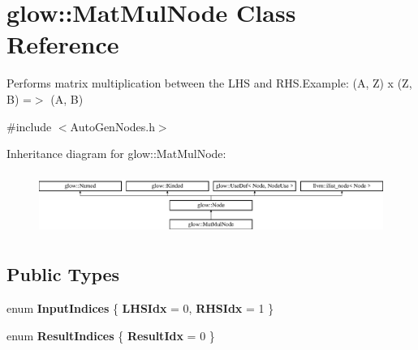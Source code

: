 \hypertarget{classglow_1_1_mat_mul_node}{}\section{glow\+:\+:Mat\+Mul\+Node Class Reference}
\label{classglow_1_1_mat_mul_node}


Performs matrix multiplication between the L\+HS and R\+H\+S.\+Example\+: (A, Z) x (Z, B) =$>$ (A, B)  




{\ttfamily \#include $<$Auto\+Gen\+Nodes.\+h$>$}

Inheritance diagram for glow\+:\+:Mat\+Mul\+Node\+:\begin{figure}[H]
\begin{center}
\leavevmode
\includegraphics[height=2.028986cm]{classglow_1_1_mat_mul_node}
\end{center}
\end{figure}
\subsection*{Public Types}
\begin{DoxyCompactItemize}
\item 
\mbox{\label{classglow_1_1_mat_mul_node_a39803dbb00117527d0bc937c4864914b}} 
enum {\bfseries Input\+Indices} \{ {\bfseries L\+H\+S\+Idx} = 0, 
{\bfseries R\+H\+S\+Idx} = 1
 \}
\item 
\mbox{\label{classglow_1_1_mat_mul_node_af69a40c6d1b1e2c46cbd415e5ce68095}} 
enum {\bfseries Result\+Indices} \{ {\bfseries Result\+Idx} = 0
 \}
\end{DoxyCompactItemize}
